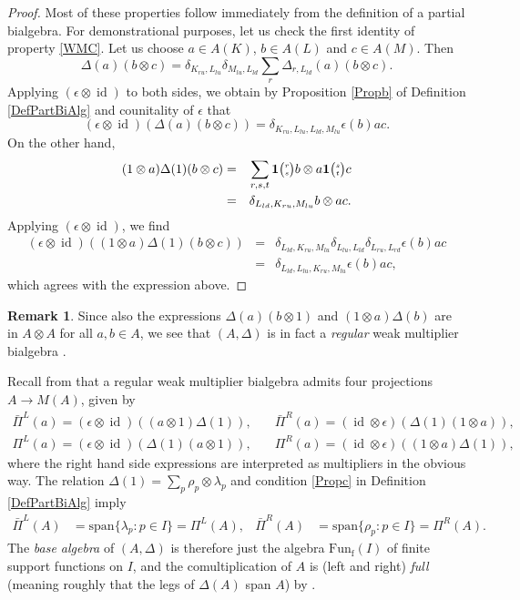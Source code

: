 \documentclass[10pt]{article}
\DeclareMathOperator{\fin}{\mathrm{f}}
\DeclareMathOperator{\id}{id}
\newcommand{\Fun}{\mathrm{Fun}}
\newcommand{\Grt}[3]{#1{\tiny {\begin{pmatrix} #2\\#3\end{pmatrix}}}}
\newcommand{\UnitC}[2]{\Grt{\mathbf{1}}{#1}{#2}}
\theoremstyle{definition}
\newtheorem{Rem}[Theorem]{Remark}
\numberwithin{equation}{section}
\begin{document}
\begin{proof} Most of these properties follow immediately from the definition of a partial bialgebra. For demonstrational purposes, let us check the first identity of property \ref{WMC}. Let us choose $a\in A(K)$, $b\in A(L)$ and $c\in A(M)$. Then \[\Delta(a)(b\otimes c) = \delta_{K_{ru},L_{lu}}\delta_{M_{lu},L_{ld}} \sum_r \Delta_{r,L_{ld}}(a)(b\otimes c).\]  Applying $(\epsilon\otimes \id)$ to both sides, we obtain by Proposition \ref{Propb} of Definition \ref{DefPartBiAlg} and counitality of $\epsilon$ that \[(\epsilon \otimes \id)(\Delta(a)(b\otimes c)) = \delta_{K_{ru},L_{lu},L_{ld},M_{lu}} \epsilon(b) ac.\] On the other hand, \begin{eqnarray*} (1\otimes a)\Delta(1)(b\otimes c) &=& \sum_{r,s,t} \UnitC{r}{s} b \otimes a\UnitC{s}{t}c \\ &=& \delta_{L_{ld},K_{ru},M_{lu}} b \otimes ac.\end{eqnarray*} Applying $(\epsilon\otimes \id)$, we find \begin{eqnarray*} (\epsilon\otimes \id)( (1\otimes a)\Delta(1)(b\otimes c) ) &=&  \delta_{L_{ld},K_{ru},M_{lu}}\delta_{L_{lu},L_{ld}}\delta_{L_{ru},L_{rd}} \epsilon(b)ac \\ &=&  \delta_{L_{ld},L_{lu},K_{ru},M_{lu}} \epsilon(b)ac,\end{eqnarray*} which agrees with the expression above.
\end{proof} 

\begin{Rem} 
Since also the expressions $\Delta(a)(b\otimes 1)$ and $(1\otimes a)\Delta(b)$ are in $A\otimes A$ for all $a,b\in A$, we see that $(A,\Delta)$ is in fact a \emph{regular} weak multiplier bialgebra \cite[Definition 2.3]{Boh1}.
\end{Rem} 

Recall from \cite[Section 3]{Boh1} that a regular weak multiplier
bialgebra admits four projections $A\rightarrow M(A)$, given
by \begin{align*} \bar{\Pi}^L(a) = (\epsilon\otimes \id)((a\otimes
  1)\Delta(1)),\quad & \bar{\Pi}^R(a) = (\id\otimes
  \epsilon)(\Delta(1)(1\otimes a)),\\ \Pi^L(a) = (\epsilon\otimes
  \id)(\Delta(1)(a\otimes 1)),\quad& \Pi^R(a) =
  (\id\otimes\epsilon)((1\otimes a)\Delta(1)),\end{align*} where the
right hand side expressions are interpreted as multipliers in the
obvious way. The relation  $\Delta(1)=\sum_{p} \rho_{p} \otimes \lambda_{p}$ and  condition \ref{Propc} in Definition \ref{DefPartBiAlg} imply
\begin{align*}
  \bar \Pi^{L}(A) &=\mathrm{span}\{\lambda_{p}:p\in I\} =  \Pi^{L}(A), &
  \bar \Pi^{R}(A) &= \mathrm{span}\{\rho_{p}:p\in I\} =\Pi^{R}(A).
\end{align*}
The \emph{base algebra} of $(A,\Delta)$ is therefore just the algebra
$\Fun_{\fin}(I)$ of finite support functions on $I$, and the
comultiplication of $A$ is (left and right) \emph{full} (meaning
roughly that the legs of $\Delta(A)$ span $A$) by \cite[Theorem 3.13]{Boh1}.  
\end{document}
